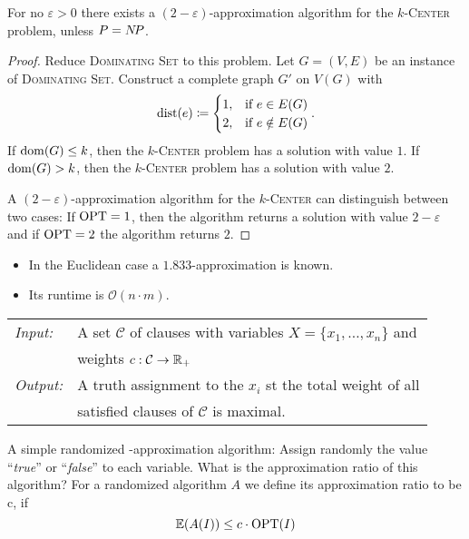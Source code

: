 \documentclass[../skript.tex]{subfiles}
\begin{document}
\begin{theorem} %
\label{thm:26}
For no $\varepsilon > 0$ there exists a $(2-\varepsilon)$-approximation algorithm for the \textsc{$k$-Center} problem, unless $P = N \! P$.
\end{theorem}
\begin{proof}
Reduce \textsc{Dominating Set} to this problem.
Let $G = (V, E)$ be an instance of \textsc{Dominating Set}.
Construct a complete graph $G'$ on $V(G)$ with
\[
	\operatorname*{dist}(e) \coloneqq \begin{cases}
	1, & \text{if } e \in E(G) \\
	2, & \text{if } e \notin E(G) \\
	\end{cases}.
\]
If $\operatorname{dom}(G) \leq k$, then the \textsc{$k$-Center} problem has a solution with value $1$.
If $\operatorname{dom}(G) > k$, then the \textsc{$k$-Center} problem has a solution with value $2$.

A $(2-\varepsilon)$-approximation algorithm for the \textsc{$k$-Center} can distinguish between two cases: If $\operatorname{OPT} = 1$, then the algorithm returns a solution with value $2 - \varepsilon$ and if $\operatorname{OPT} = 2$ the algorithm returns $2$.
\end{proof}
\begin{remark}
\begin{itemize}
\item In the Euclidean case a $1.833$-approximation is known.
\item Its runtime is $\mathcal{O}(n\cdot m)$.
\end{itemize}
\end{remark}
\begin{problem}
\begin{tabular}{ll}
\textit{Input:} & A set $\mathcal{C}$ of clauses with variables $X = \{ x_1, \ldots, x_n \}$ and \\
& weights $c : \mathcal{C} \to \mathbb{R}_+$ \\
\textit{Output:} & A truth assignment to the $x_i$ \ac{st} the total weight of all \\
& satisfied clauses of $\mathcal{C}$ is maximal.
\end{tabular}
\end{problem}
A simple randomized -approximation algorithm: Assign randomly the value ``\textit{true}'' or ``\textit{false}'' to each variable.
What is the approximation ratio of this algorithm?
For a randomized algorithm $A$ we define its approximation ratio to be c, if
\[
	\mathbb{E}(A(I)) \leq c \cdot \operatorname{OPT}(I)
\]
\end{document}
